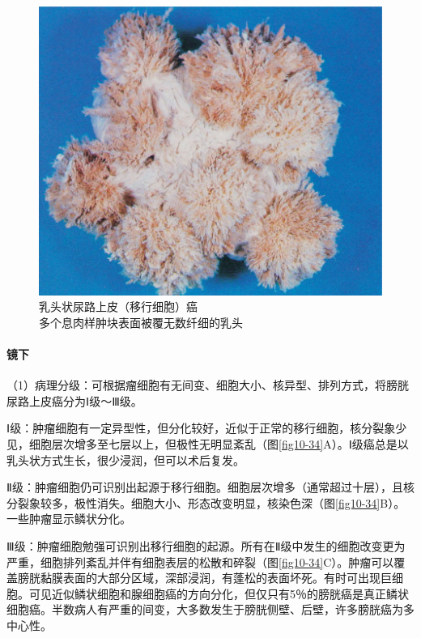 \begin{figure}[!htbp]
 \centering
 \includegraphics{./images/Image00182.jpg}
 \captionsetup{justification=centering}
 \caption{乳头状尿路上皮（移行细胞）癌\\ {\small 多个息肉样肿块表面被覆无数纤细的乳头}}
\label{fig10-33}
  \end{figure}

\paragraph{镜下}
（1）病理分级：可根据瘤细胞有无间变、细胞大小、核异型、排列方式，将膀胱尿路上皮癌分为Ⅰ级～Ⅲ级。

Ⅰ级：肿瘤细胞有一定异型性，但分化较好，近似于正常的移行细胞，核分裂象少见，细胞层次增多至七层以上，但极性无明显紊乱（图\ref{fig10-34}A）。Ⅰ级癌总是以乳头状方式生长，很少浸润，但可以术后复发。

Ⅱ级：肿瘤细胞仍可识别出起源于移行细胞。细胞层次增多（通常超过十层），且核分裂象较多，极性消失。细胞大小、形态改变明显，核染色深（图\ref{fig10-34}B）。一些肿瘤显示鳞状分化。

Ⅲ级：肿瘤细胞勉强可识别出移行细胞的起源。所有在Ⅱ级中发生的细胞改变更为严重，细胞排列紊乱并伴有细胞表层的松散和碎裂（图\ref{fig10-34}C）。肿瘤可以覆盖膀胱黏膜表面的大部分区域，深部浸润，有蓬松的表面坏死。有时可出现巨细胞。可见近似鳞状细胞和腺细胞癌的方向分化，但仅只有5％的膀胱癌是真正鳞状细胞癌。半数病人有严重的间变，大多数发生于膀胱侧壁、后壁，许多膀胱癌为多中心性。

